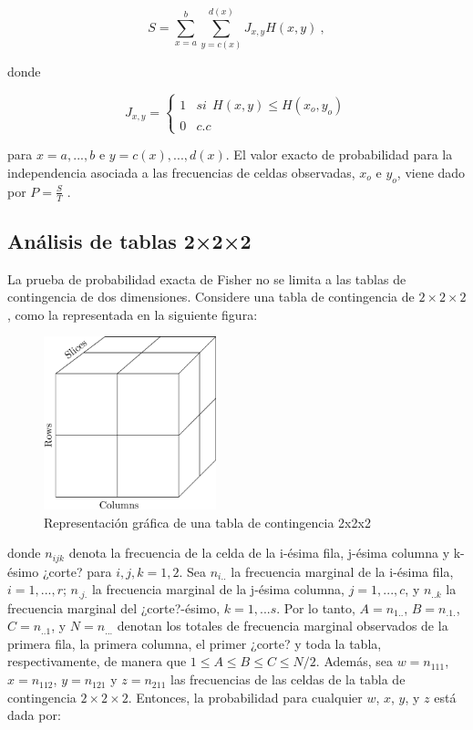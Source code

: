 \documentclass[12pt,a4paper,]{book}
\numberwithin{dummy}{section}
\theoremstyle{ocrenumbox}
\theoremstyle{blacknumex}
\theoremstyle{blacknumbox}
\theoremstyle{ocrenum}
\theoremstyle{ocrenum}
\begin{document}
\[
S=\sum_{x=a}^b\sum_{y=c(x)}^{d(x)}J_{x,y}H(x,y)~,
\]

donde

\[
J_{x,y}=\begin{cases}1 & si~~H(x,y)\le H(x_o,y_o) \\0 & c.c\end{cases}
\]

para \(x = a, . . . , b\) e \(y = c(x), . . . , d(x)\). El valor exacto
de probabilidad para la independencia asociada a las frecuencias de
celdas observadas, \(x_o\) e \(y_o\), viene dado por \(P = \frac{S}{T}\)
.

\hypertarget{anuxe1lisis-de-tablas-222}{%
\subsection{Análisis de tablas 2×2×2}\label{anuxe1lisis-de-tablas-222}}

La prueba de probabilidad exacta de Fisher no se limita a las tablas de
contingencia de dos dimensiones. Considere una tabla de contingencia de
\(2\times2\times2\), como la representada en la siguiente figura:

\begin{figure}[H]

{\centering \includegraphics[width=5cm]{graficos/contingencia2x2x2} 

}

\caption{\label{fig:contingencia}Representación gráfica de una tabla de contingencia 2x2x2}\label{fig:unnamed-chunk-2}
\end{figure}

donde \(n_{ijk}\) denota la frecuencia de la celda de la i-ésima fila,
j-ésima columna y k-ésimo ¿corte? para \(i, j, k = 1, 2\). Sea
\(n_{i..}\) la frecuencia marginal de la i-ésima fila,
\(i = 1, . . . , r\); \(n_{.j.}\) la frecuencia marginal de la j-ésima
columna, \(j = 1, . . . ,c\), y \(n_{..k}\) la frecuencia marginal del
¿corte?-ésimo, \(k = 1, . . . s\). Por lo tanto, \(A = n_{1..}\),
\(B = n_{.1.}\), \(C = n_{..1}\), y \(N = n_{...}\) denotan los totales
de frecuencia marginal observados de la primera fila, la primera
columna, el primer ¿corte? y toda la tabla, respectivamente, de manera
que \(1 \le A \le B \le C \le N/2\). Además, sea \(w = n_{111}\),
\(x = n_{112}\), \(y = n_{121}\) y \(z = n_{211}\) las frecuencias de
las celdas de la tabla de contingencia \(2\times2\times2\). Entonces, la
probabilidad para cualquier \(w\), \(x\), \(y\), y \(z\) está dada por:
\end{document}
